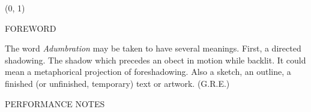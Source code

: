 \documentclass[11pt]{article}
\begin{document}
\begin{textblock}{23}(0, 1)
\begin{center}
\huge FOREWORD
\end{center}
\end{textblock}

\vspace*{0.25\baselineskip}

\begingroup
\begin{center}
The word \textit{Adumbration} may be taken to have several meanings. First, a directed shadowing. The shadow which precedes an obect in motion while backlit. It could mean a metaphorical projection of foreshadowing. Also a sketch, an outline, a finished (or unfinished, temporary) text or artwork.
\rightskip\leftskip
\phantom{text} \hfill (G.R.E.)
\end{center}
\endgroup

\vspace*{1.25\baselineskip}

\begin{center}
\huge PERFORMANCE NOTES
\end{center}
\end{document}
